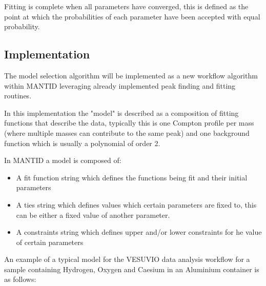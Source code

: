 \documentclass[a4paper]{article}
\begin{document}
Fitting is complete when all parameters have converged, this is defined as the
point at which the probabilities of each parameter have been accepted with equal
probability.

\subsection{Implementation}
\label{sec:bayes_implementation}

The model selection algorithm will be implemented as a new workflow algorithm
within \gls*{MANTID} leveraging already implemented peak finding and fitting
routines.

In this implementation the "model" is described as a composition of fitting
functions that describe the data, typically this is one Compton profile per mass
(where multiple masses can contribute to the same peak) and one background
function which is usually a polynomial of order 2.

In \gls*{MANTID} a model is composed of:

\begin{itemize}
  \item
    A fit function string which defines the functions being fit and their
    initial parameters

  \item
    A ties string which defines values which certain parameters are fixed to,
    this can be either a fixed value of another parameter.

  \item
    A constraints string which defines upper and/or lower constraints for he
    value of certain parameters
\end{itemize}

An example of a typical model for the VESUVIO data analysis workflow for a
sample containing Hydrogen, Oxygen and Caesium in an Aluminium container is as
follows:
\end{document}
